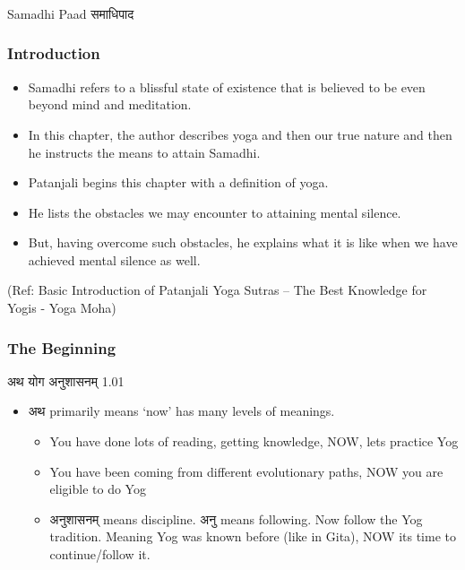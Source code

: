 \begin{frame}[fragile]\frametitle{}
\begin{center}
{\Large Samadhi Paad समाधिपाद}
\end{center}
\end{frame}


\begin{frame}[fragile]\frametitle{Introduction}


	\begin{itemize}
	\item Samadhi refers to a blissful state of existence that is believed to be even beyond mind and meditation.
	\item In this chapter, the author describes yoga and then our true nature and then he instructs the means to attain Samadhi. 
	\item Patanjali begins this chapter with a definition of yoga.
	\item He lists the obstacles we may encounter to attaining mental silence. 
	\item But, having overcome such obstacles, he explains what it is like when we have achieved mental silence as well.
	\end{itemize}

\tiny{(Ref: Basic Introduction of Patanjali Yoga Sutras – The Best Knowledge for Yogis - Yoga Moha)}

\end{frame}


\begin{frame}[fragile]\frametitle{The Beginning}

अथ योग अनुशासनम् 1.01

	\begin{itemize}
	\item अथ primarily means `now' has many levels of meanings.
	\begin{itemize}
	\item You have done lots of reading, getting knowledge, NOW, lets practice Yog
	\item You have been coming from different evolutionary paths, NOW you are eligible to do Yog
	\item अनुशासनम् means discipline. अनु means following. Now follow the Yog tradition. Meaning Yog was known before (like in Gita), NOW its time to continue/follow it.
	\end{itemize}	
	\end{itemize}

\end{frame}


